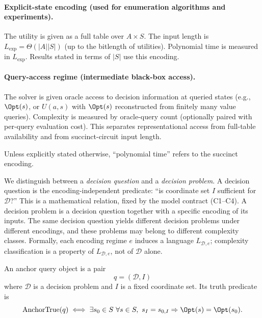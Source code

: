\paragraph{Explicit-state encoding (used for enumeration algorithms and experiments).}
The utility is given as a full table over $A \times S$. The input length is $L_{\text{exp}} = \Theta(|A||S|)$ (up to the bitlength of utilities). Polynomial time is measured in $L_{\text{exp}}$. Results stated in terms of $|S|$ use this encoding.

\paragraph{Query-access regime (intermediate black-box access).}
The solver is given oracle access to decision information at queried states (e.g., $\Opt(s)$, or $U(a,s)$ with $\Opt(s)$ reconstructed from finitely many value queries). Complexity is measured by oracle-query count (optionally paired with per-query evaluation cost). This separates representational access from full-table availability and from succinct-circuit input length.

Unless explicitly stated otherwise, ``polynomial time'' refers to the succinct encoding.

\begin{remark}\label{rem:question-vs-problem}
We distinguish between a \emph{decision question} and a \emph{decision problem}. A decision question is the encoding-independent predicate: ``is coordinate set $I$ sufficient for $\mathcal{D}$?'' This is a mathematical relation, fixed by the model contract (C1--C4). A decision problem is a decision question together with a specific encoding of its inputs. The same decision question yields different decision problems under different encodings, and these problems may belong to different complexity classes. Formally, each encoding regime $e$ induces a language $L_{\mathcal{D},e}$; complexity classification is a property of $L_{\mathcal{D},e}$, not of $\mathcal{D}$ alone.
\end{remark}

\begin{definition}\label{def:anchor-query-object}
An anchor query object is a pair
\[
q=(\mathcal{D},I)
\]
where $\mathcal{D}$ is a decision problem and $I$ is a fixed coordinate set. Its truth predicate is
\[
\mathrm{AnchorTrue}(q)\iff
\exists s_0\in S\ \forall s\in S,\ s_I=s_{0,I}\Rightarrow \Opt(s)=\Opt(s_0).
\]
\end{definition}

